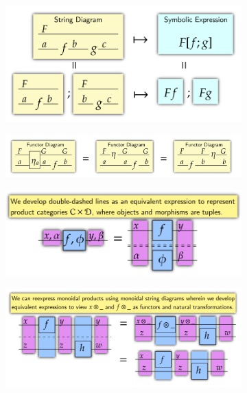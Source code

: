 \documentclass[11pt,a4paper,openright,twoside]{report}
\theoremstyle{plain}
\theoremstyle{definition}
\begin{document}
\begin{figure}[h]
  \begin{center}
    \begin{subfigure}{0.39\textwidth}
      \includegraphics[width=\textwidth]{figures/functors.png}
      \caption{}
    \end{subfigure}
    \begin{subfigure}{0.6\textwidth}
      \includegraphics[width=\textwidth]{figures/natural_transformations.png}
      \caption{}
    \end{subfigure}
    \begin{subfigure}{0.5\textwidth}
      \includegraphics[width=\textwidth]{figures/product_diagram.png}
      \caption{}
    \end{subfigure}
    \begin{subfigure}{0.6\textwidth}
      \includegraphics[width=\textwidth]{figures/monoidal_product_diagram.png}

\end{subfigure}
\end{center}
\end{figure}
\end{document}
